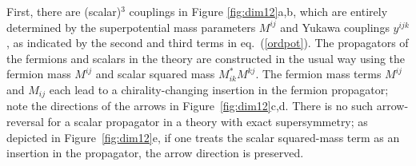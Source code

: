 \documentclass[11pt]{article}
\begin{document}
% 
First, there are (scalar)$^3$ couplings in Figure
\ref{fig:dim12}a,b, which are entirely determined by the superpotential
mass parameters $M^{ij}$ and Yukawa couplings $y^{ijk}$, as indicated by
the second and third terms in eq.~(\ref{ordpot}). The propagators of the
fermions and scalars in the theory are constructed in the usual way using
the fermion mass $M^{ij}$ and scalar squared mass $M^*_{ik}M^{kj}$. The
fermion mass terms $M^{ij}$ and $M_{ij}$ each lead to a chirality-changing
insertion in the fermion propagator; note the directions of the arrows in
Figure~\ref{fig:dim12}c,d. There is no such arrow-reversal for a scalar
propagator in a theory with exact supersymmetry; as depicted in
Figure~\ref{fig:dim12}e, if one treats the scalar squared-mass term as an
insertion in the propagator, the arrow direction is preserved. 
\end{document}
